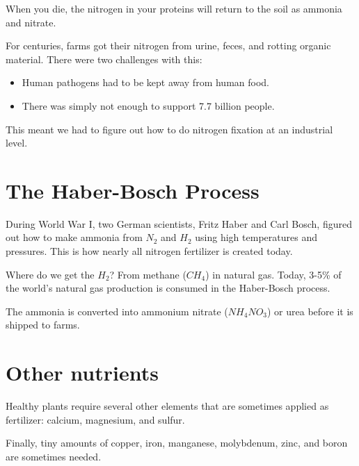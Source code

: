 When you die, the nitrogen in your proteins will return to the soil as
ammonia and nitrate.

For centuries, farms got their nitrogen from urine, feces, and rotting
organic material. There were two challenges with this:
\begin{itemize}
\item Human pathogens had to be kept away from human food.
\item There was simply not enough to support 7.7 billion people.
\end{itemize}

This meant we had to figure out how to do nitrogen fixation at an industrial
level.

\section{The Haber-Bosch Process}

During World War I, two German scientists, Fritz Haber and Carl Bosch,
figured out how to make ammonia from $N_2$ and $H_2$ using high
temperatures and pressures. This is how nearly all nitrogen fertilizer
is created today.

Where do we get the $H_2$? From methane ($CH_4$) in natural gas. Today, 3-5\%
of the world's natural gas production is consumed in the Haber-Bosch
process.

The ammonia is converted into ammonium nitrate ($NH_4NO_3$) or urea
before it is shipped to farms.

\section{Other nutrients}

Healthy plants require several other elements that are sometimes
applied as fertilizer: calcium, magnesium, and sulfur.

Finally, tiny amounts of copper, iron, manganese, molybdenum, zinc, and
boron are sometimes needed.
